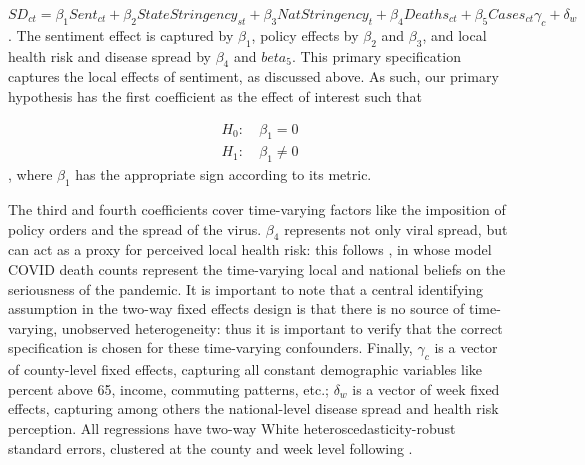 \documentclass[12pt,a4]{article}
\begin{document}
\begin{equation}
  \label{eq:mainspec}
  SD_{ct} = \beta_1 Sent_{ct}  + \beta_2 StateStringency_{st} + \beta_3 NatStringency_{t} + \beta_4 Deaths_{ct} + \beta_5 Cases_{ct} \gamma_c + \delta_w
\end{equation}. The sentiment effect is captured by \(\beta_1\), policy effects by \(\beta_2\) and \(\beta_3\), and local health risk and disease spread by \(\beta_4\) and \(beta_5\).  This primary specification captures the local effects of sentiment, as discussed above. As such, our primary hypothesis has the first coefficient as the effect of interest such that

\begin{align*}
  H_0 : &\: \beta_1 = 0 \\
  H_1 : &\: \beta_1 \neq 0
\end{align*}, where \(\beta_1\) has the appropriate sign according to its metric.

The third and fourth coefficients cover time-varying factors like the imposition of policy orders and the spread of the virus. \(\beta_4\) represents not only viral spread, but can act as a proxy for perceived local health risk: this follows \textcite{chernozhukovCausalImpactMasks2021}, in whose model COVID death counts represent the time-varying local and national beliefs on the seriousness of the pandemic. It is important to note that a central identifying assumption in the two-way fixed effects design is that there is no source of time-varying, unobserved heterogeneity: thus it is important to verify that the correct specification is chosen for these time-varying confounders. Finally, \(\gamma_c\) is a vector of county-level fixed effects, capturing all constant demographic variables like percent above 65, income, commuting patterns, etc.; \(\delta_w\) is a vector of week fixed effects, capturing among others the national-level disease spread and health risk perception. All regressions have two-way White heteroscedasticity-robust standard errors, clustered at the county and week level following \textcite{abadieWhenShouldYou2017}.
\end{document}
